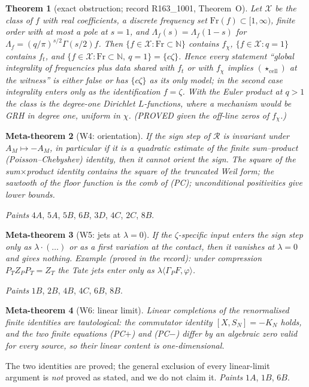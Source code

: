 \documentclass[11pt]{amsart}
\newtheorem{theorem}{Theorem}[section]
\newtheorem{metatheorem}[theorem]{Meta-theorem}
\theoremstyle{definition}
\theoremstyle{remark}
\newcommand{\N}{\mathbb N}
\begin{document}
\begin{theorem}[exact obstruction; record R163\_1001, Theorem~O]\label{thm:O}
Let $\mathcal X$ be the class of $f$ with real coefficients, a discrete frequency set $\mathrm{Fr}(f)\subset[1,\infty)$,
finite order with at most a pole at $s=1$, and $\Lambda_f(s)=\Lambda_f(1-s)$ for $\Lambda_f=(q/\pi)^{s/2}\Gamma(s/2)f$.
Then $\{f\in\mathcal X:\mathrm{Fr}\subset\N\}$ contains $f_\chi$, $\{f\in\mathcal X:q=1\}$ contains $f_t$, and
$\{f\in\mathcal X:\mathrm{Fr}\subset\N,\ q=1\}=\{c\zeta\}$. Hence every statement ``global integrality of frequencies
plus data shared with $f_t$ or with $f_\chi$ implies $(\star_{\mathrm{cell}})$ at the witness'' is either false or has
$\{c\zeta\}$ as its only model; in the second case integrality enters only as the identification $f=\zeta$. With the
Euler product at $q>1$ the class is the degree-one Dirichlet $L$-functions, where a mechanism would be GRH in degree
one, uniform in $\chi$. (PROVED given the off-line zeros of $f_\chi$.)
\end{theorem}

\begin{metatheorem}[W4: orientation]\label{W4}
If the sign step of $\mathcal R$ is invariant under $A_M\mapsto-A_M$, in particular if it is a quadratic
estimate of the finite sum--product (Poisson--Chebyshev) identity, then it cannot orient the sign. The
square of the sum$\times$product identity contains the square of the truncated Weil form; the sawtooth of
the floor function is the comb of (PC); unconditional positivities give lower bounds.
\end{metatheorem}
\noindent \emph{Paints} $4A$, $5A$, $5B$, $6B$, $3D$, $4C$, $2C$, $8B$.

\begin{metatheorem}[W5: jets at $\lambda=0$]\label{W5}
If the $\zeta$-specific input enters the sign step only as $\lambda\cdot(\dots)$ or as a first variation at
the contact, then it vanishes at $\lambda=0$ and gives nothing. Example (proved in the record): under
compression $P_TZ_PP_T=Z_T$ the Tate jets enter only as $\lambda\langle\Gamma_PF,\varphi\rangle$.
\end{metatheorem}
\noindent \emph{Paints} $1B$, $2B$, $4B$, $4C$, $6B$, $8B$.

\begin{metatheorem}[W6: linear limit]\label{W6}
Linear completions of the renormalised finite identities are tautological: the commutator identity
$[X,S_N]=-K_N$ holds, and the two finite equations (PC$+$) and (PC$-$) differ by an algebraic zero valid for
every source, so their linear content is one-dimensional.
\end{metatheorem}
\noindent The two identities are proved; the general exclusion of every linear-limit argument is
\emph{not} proved as stated, and we do not claim it. \emph{Paints} $1A$, $1B$, $6B$.
\end{document}
